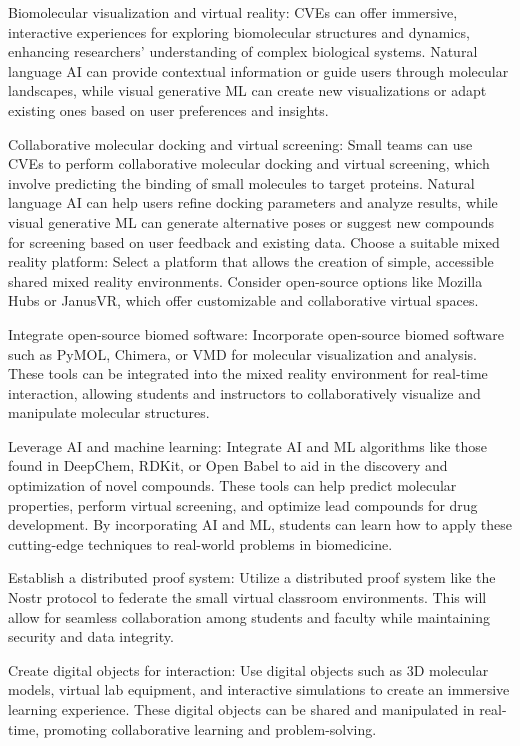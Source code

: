     Biomolecular visualization and virtual reality:
    CVEs can offer immersive, interactive experiences for exploring biomolecular structures and dynamics, enhancing researchers' understanding of complex biological systems. Natural language AI can provide contextual information or guide users through molecular landscapes, while visual generative ML can create new visualizations or adapt existing ones based on user preferences and insights.

    Collaborative molecular docking and virtual screening:
    Small teams can use CVEs to perform collaborative molecular docking and virtual screening, which involve predicting the binding of small molecules to target proteins. Natural language AI can help users refine docking parameters and analyze results, while visual generative ML can generate alternative poses or suggest new compounds for screening based on user feedback and existing data.
    Choose a suitable mixed reality platform: Select a platform that allows the creation of simple, accessible shared mixed reality environments. Consider open-source options like Mozilla Hubs or JanusVR, which offer customizable and collaborative virtual spaces.

    Integrate open-source biomed software: Incorporate open-source biomed software such as PyMOL, Chimera, or VMD for molecular visualization and analysis. These tools can be integrated into the mixed reality environment for real-time interaction, allowing students and instructors to collaboratively visualize and manipulate molecular structures.

    Leverage AI and machine learning: Integrate AI and ML algorithms like those found in DeepChem, RDKit, or Open Babel to aid in the discovery and optimization of novel compounds. These tools can help predict molecular properties, perform virtual screening, and optimize lead compounds for drug development. By incorporating AI and ML, students can learn how to apply these cutting-edge techniques to real-world problems in biomedicine.

    Establish a distributed proof system: Utilize a distributed proof system like the Nostr protocol to federate the small virtual classroom environments. This will allow for seamless collaboration among students and faculty while maintaining security and data integrity.

    Create digital objects for interaction: Use digital objects such as 3D molecular models, virtual lab equipment, and interactive simulations to create an immersive learning experience. These digital objects can be shared and manipulated in real-time, promoting collaborative learning and problem-solving.


